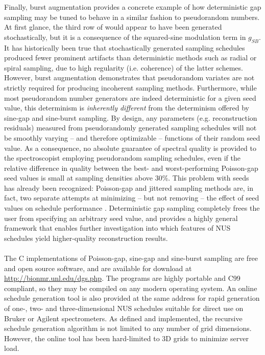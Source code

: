 \begin{doublespace}
Finally, burst augmentation provides a concrete example of how deterministic
gap sampling may be tuned to behave in a similar fashion to pseudorandom
numbers. At first glance, the third row of  would
appear to have been generated stochastically, but it is a consequence of the
squared-sine modulation term in $g_{SB}$. It has historically been true that
stochastically generated sampling schedules produced fewer prominent artifacts
than deterministic methods such as radial or spiral sampling, due to high
regularity (i.e. coherence) of the latter schemes. However, burst augmentation
demonstrates that pseudorandom variates are not strictly required for producing
incoherent sampling methods. Furthermore, while most pseudorandom number
generators are indeed deterministic for a given seed value, this
determinism is \emph{inherently different} from the determinism
offered by sine-gap and sine-burst sampling. By design, any
parameters (e.g. reconstruction residuals) measured from pseudorandomly
generated sampling schedules will not be smoothly varying -- and therefore
optimizable -- functions of their random seed value. As a consequence, no
absolute guarantee of spectral quality is provided to the spectroscopist
employing pseudorandom sampling schedules, even if the relative difference
in quality between the best- and worst-performing Poisson-gap seed values
is small at sampling densities above 30\%. This problem with seeds has
already been recognized: Poisson-gap and jittered sampling methods are, in
fact, two separate attempts at minimizing -- but not removing -- the effect
of seed values on schedule performance
\cite{hyberts:jacs2010,kazimierczuk:jmr2007,mobli:jmr2015}. Deterministic
gap sampling completely frees the user from specifying an arbitrary seed
value, and provides a highly general framework that enables further
investigation into which features of NUS schedules yield higher-quality
reconstruction results.
\\\\
The C implementations of Poisson-gap, sine-gap and sine-burst sampling are
free and open source software, and are available for download at
\url{http://bionmr.unl.edu/dgs.php}. The programs are highly portable and
C99 compliant, so they may be compiled on any modern operating system. An
online schedule generation tool is also provided at the same address for
rapid generation of one-, two- and three-dimensional NUS schedules suitable
for direct use on Bruker or Agilent spectrometers. As defined and implemented,
the recursive schedule generation algorithm is not limited to any number of
grid dimensions. However, the online tool has been hard-limited to 3D grids
to minimize server load.
\end{doublespace}




